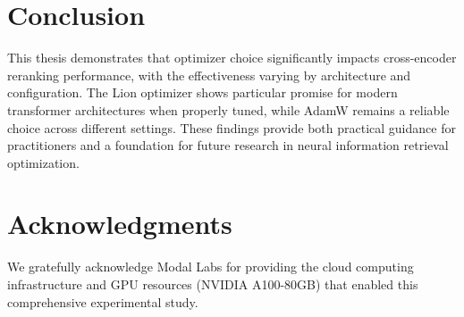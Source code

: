 \section{Conclusion}

This thesis demonstrates that optimizer choice significantly impacts cross-encoder reranking performance, with the effectiveness varying by architecture and configuration. The Lion optimizer shows particular promise for modern transformer architectures when properly tuned, while AdamW remains a reliable choice across different settings. These findings provide both practical guidance for practitioners and a foundation for future research in neural information retrieval optimization.

\section*{Acknowledgments}

We gratefully acknowledge Modal Labs for providing the cloud computing infrastructure and GPU resources (NVIDIA A100-80GB) that enabled this comprehensive experimental study.